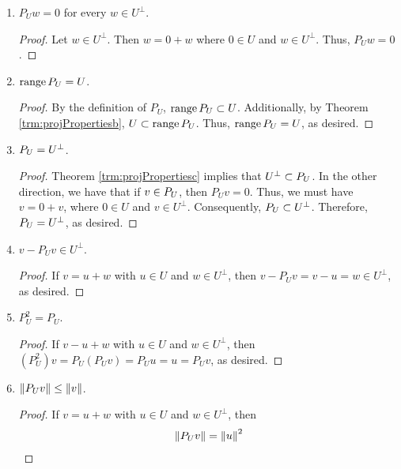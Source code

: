 \documentclass[../main.tex]{subfiles}
\begin{document}
\begin{itemize}
\begin{theorem}
\begin{enumerate}[label={\textup{(}\alph*\textup{)}},ref={\thetheorem\alph*}]
            \begin{proof}
                Let $u\in U$ be arbitrary. Then $u=u+0$ where $u\in U$ and $0\in U^\perp$. Thus, $P_Uu=u$.
            \end{proof}
            \item \label{trm:projPropertiesc}$P_Uw=0$ for every $w\in U^\perp$.
            \begin{proof}
                Let $w\in U^\perp$. Then $w=0+w$ where $0\in U$ and $w\in U^\perp$. Thus, $P_Uw=0$.
            \end{proof}
            \item \label{trm:projPropertiesd}$\operatorname{range} P_U=U$.
            \begin{proof}
                By the definition of $P_U$, $\operatorname{range} P_U\subset U$. Additionally, by Theorem \ref{trm:projPropertiesb}, $U\subset\operatorname{range} P_U$. Thus, $\operatorname{range} P_U=U$, as desired.
            \end{proof}
            \item \label{trm:projPropertiese}$\null P_U=U^\perp$.
            \begin{proof}
                Theorem \ref{trm:projPropertiesc} implies that $U^\perp\subset\null P_U$. In the other direction, we have that if $v\in\null P_U$, then $P_Uv=0$. Thus, we must have $v=0+v$, where $0\in U$ and $v\in U^\perp$. Consequently, $\null P_U\subset U^\perp$. Therefore, $\null P_U=U^\perp$, as desired.
            \end{proof}
            \item \label{trm:projPropertiesf}$v-P_Uv\in U^\perp$.
            \begin{proof}
                If $v=u+w$ with $u\in U$ and $w\in U^\perp$, then $v-P_Uv=v-u=w\in U^\perp$, as desired.
            \end{proof}
            \item \label{trm:projPropertiesg}$P_U^2=P_U$.
            \begin{proof}
                If $v-u+w$ with $u\in U$ and $w\in U^\perp$, then $(P_U^2)v=P_U(P_Uv)=P_Uu=u=P_Uv$, as desired.
            \end{proof}
            \item \label{trm:projPropertiesh}$\norm{P_Uv}\leq\norm{v}$.
            \begin{proof}
                If $v=u+w$ with $u\in U$ and $w\in U^\perp$, then
                \begin{align*}
                    \norm{P_Uv} &= \norm{u}^2\\

\end{align*}
\end{proof}
\end{enumerate}
\end{theorem}
\end{itemize}
\end{document}
